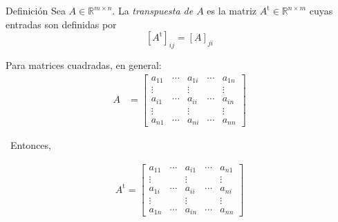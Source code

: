 \documentclass[handout]{beamer} %
\renewcommand{\t}{{\operatorname{t}}}
\newcommand{\R}{\mathbb R}
\renewcommand{\t}{{\operatorname{t}}}
\begin{document}
\begin{frame}

    \begin{exampleblock}{Definición}
    Sea $A\in\R^{m\times n}$. La \textit{transpuesta de $A$} es la matriz {$A^{\t}\in\R^{n\times m}$} cuyas entradas son definidas por
    $$
    [A^\t]_{ij}=[A]_{ji}
    $$
    \end{exampleblock}\pause

    \end{frame}
    
    \begin{frame}
        Para matrices cuadradas, en general: 
    \begin{align*}
    A&=
    \left[
    \begin{array}{ccccc}
     a_{11} & \cdots & a_{1i} & \cdots & a_{1n}\\
     \vdots & & \vdots & & \vdots\\
     a_{i1} & \cdots &  a_{ii} & \cdots & a_{in}\\  
     \vdots & & \vdots & & \vdots\\
     a_{n1} & \cdots & a_{ni} & \cdots & a_{nn}
    \end{array}
    \right] 
    \end{align*}
    
    \
    \pause Entonces, 
    \
    
    \begin{align*}
    A^\t=
    \left[
    \begin{array}{ccccc}
     a_{11} & \cdots & a_{i1} & \cdots & a_{n1}\\
     \vdots & & \vdots & & \vdots\\
     a_{1i} & \cdots & a_{ii} & \cdots & a_{ni}\\  
     \vdots & & \vdots & & \vdots\\
     a_{1n} & \cdots & a_{in} & \cdots & a_{nn}
    \end{array}
    \right] 
    \end{align*} 
    \end{frame}
    
\end{document}
